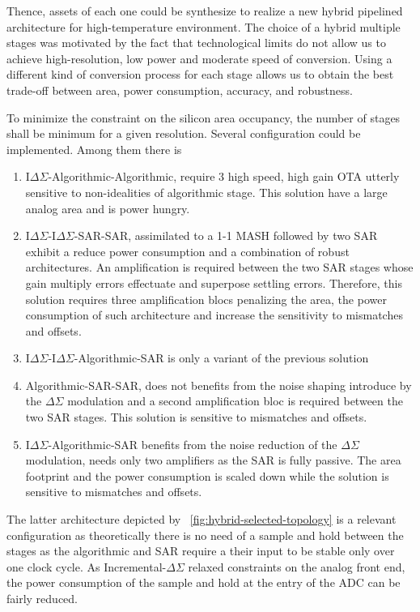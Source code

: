 Thence, assets of each one could be synthesize to realize a new hybrid pipelined architecture for high-temperature environment. The choice of a hybrid multiple stages was motivated by the fact that technological limits do not allow us to achieve high-resolution, low power and moderate speed of conversion. Using a different kind of conversion process for each stage allows us to obtain the best trade-off between area, power consumption, accuracy, and robustness.

To minimize the constraint on the silicon area occupancy, the number of stages shall be minimum for a given resolution. Several configuration could be implemented. Among them there is 

\begin{enumerate}
	
\item I\(\Delta\Sigma \)-Algorithmic-Algorithmic, require 3 high speed, high gain OTA utterly sensitive to non-idealities of algorithmic stage. This solution have a large analog area and is power hungry.
\item I\(\Delta\Sigma \)-I\(\Delta\Sigma \)-SAR-SAR, assimilated to a 1-1 MASH followed by two SAR exhibit a reduce power consumption and a combination of robust architectures. An amplification is required between the two SAR stages whose gain multiply errors effectuate and superpose settling errors. Therefore, this solution requires three amplification blocs penalizing the area, the power consumption of such architecture and increase the sensitivity to mismatches and offsets.
\item I\(\Delta\Sigma \)-I\(\Delta\Sigma \)-Algorithmic-SAR is only a variant of the previous solution
\item Algorithmic-SAR-SAR, does not benefits from the noise shaping introduce by the \(\Delta\Sigma \) modulation and a second amplification bloc is required between the two SAR stages. This solution is sensitive to mismatches and offsets.
\item I\(\Delta\Sigma \)-Algorithmic-SAR benefits from the noise reduction of the \(\Delta\Sigma \) modulation, needs only two amplifiers as the SAR is fully passive. The area footprint and the power consumption is scaled down while the solution is sensitive to mismatches and offsets.
\end{enumerate}

The latter architecture depicted by \figurename~\ref{fig:hybrid-selected-topology} is a relevant configuration as theoretically there is no need of a sample and hold between the stages as the algorithmic and SAR require a their input to be stable only over one clock cycle. As Incremental-\(\Delta\Sigma \) relaxed constraints on the analog front end, the power consumption of the sample and hold at the entry of the ADC can be fairly reduced.

